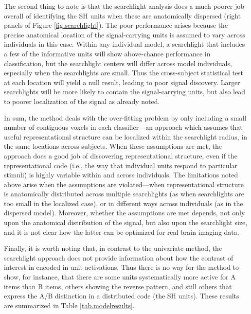 The second thing to note is that the searchlight analysis does a much poorer job overall of identifying the SH units when these are anatomically dispersed (right panels of Figure \ref{fig.searchlight}). The poor performance arises because the precise anatomical location of the signal-carrying units is assumed to vary across individuals in this case. Within any individual model, a searchlight that includes a few of the informative units will show above-chance performance in classification, but the searchlight centers will differ across model individuals, especially when the searchlights are small. Thus the cross-subject statistical test at each location will yield a null result, leading to poor signal discovery. Larger searchlights will be more likely to contain the signal-carrying units, but also lead to poorer localization of the signal as already noted. 

In sum, the method deals with the over-fitting problem by only including a small number of contiguous voxels in each classifier---an approach which assumes that useful representational structure can be localized within the searchlight radius, in the same locations across subjects. When these assumptions are met, the approach does a good job of discovering representational structure, even if the representational code (i.e., the way that individual units respond to particular stimuli) is highly variable within and across individuals. The limitations noted above arise when the assumptions are violated---when representational structure is anatomically distributed across multiple searchlights (as when searchlights are too small in the localized case), or in different ways across individuals (as in the dispersed model). Moreover, whether the assumptions are met depends, not only upon the anatomical distribution of the signal, but also upon the searchlight size, and it is not clear how the latter can be optimized for real brain imaging data.  

Finally, it is worth noting that, in contrast to the univariate method, the searchlight approach does not provide information about how the contrast of interest in encoded in unit activations. Thus there is no way for the method to show, for instance, that there are some units systematically more active for A items than B items, others showing the reverse pattern, and still others that express the A/B distinction in a distributed code (the SH units). These results are summarized in Table \ref{tab.modelresults}.

